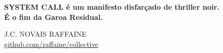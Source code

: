 {{{\begin{minipage}[b][0.7\paperheight][c]{0.8\paperwidth}
                \vspace{4ex}

                \begin{center}
                    \fontsize{11}{14}\selectfont\textbf{SYSTEM CALL é um manifesto disfarçado de thriller noir.} \\
                    \fontsize{11}{14}\selectfont\textbf{É o fim da Garoa Residual.}
                \end{center}

                \vspace{8ex}

                \begin{center}
                    \fontsize{10}{12}\selectfont
                    J.C. NOVAIS RAFFAINE \\ \url{github.com/raffaine/collective}
                \end{center}
            \end{minipage}
        }
    }
}
\newpage
